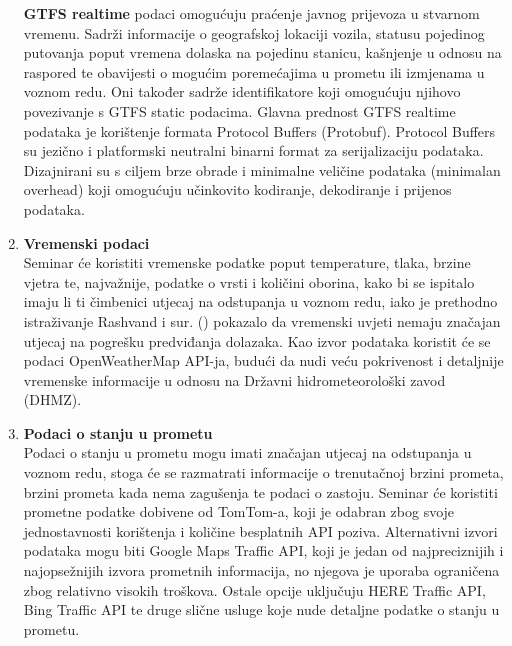 \documentclass[seminarskirad]{fer}
\begin{document}
\begin{enumerate}
	\textbf{GTFS realtime} podaci omogućuju praćenje javnog prijevoza u stvarnom vremenu. Sadrži informacije o geografskoj lokaciji vozila, statusu pojedinog putovanja poput vremena dolaska na pojedinu stanicu, kašnjenje u odnosu na raspored te obavijesti o mogućim poremećajima u prometu ili izmjenama u voznom redu. Oni također sadrže identifikatore koji omogućuju njihovo povezivanje s GTFS static podacima. Glavna prednost GTFS realtime podataka je korištenje formata Protocol Buffers (Protobuf). Protocol Buffers su jezično i platformski neutralni binarni format za serijalizaciju podataka. Dizajnirani su s ciljem brze obrade i minimalne veličine podataka (minimalan overhead) koji omogućuju učinkovito kodiranje, dekodiranje i prijenos podataka.
	
	\item \textbf{Vremenski podaci}\\
	Seminar će koristiti vremenske podatke poput temperature, tlaka, brzine vjetra te, najvažnije, podatke o vrsti i količini oborina, kako bi se ispitalo imaju li ti čimbenici utjecaj na odstupanja u voznom redu, iako je prethodno istraživanje Rashvand i sur. (\cite{article1}) pokazalo da vremenski uvjeti nemaju značajan utjecaj na pogrešku predviđanja dolazaka. Kao izvor podataka koristit će se podaci OpenWeatherMap API-ja, budući da nudi veću pokrivenost i detaljnije vremenske informacije u odnosu na Državni hidrometeorološki zavod (DHMZ).
	
	\item \textbf{Podaci o stanju u prometu}\\
	Podaci o stanju u prometu mogu imati značajan utjecaj na odstupanja u voznom redu, stoga će se razmatrati informacije o trenutačnoj brzini prometa, brzini prometa kada nema zagušenja te podaci o zastoju. Seminar će koristiti prometne podatke dobivene od TomTom-a, koji je odabran zbog svoje jednostavnosti korištenja i količine besplatnih API poziva. Alternativni izvori podataka mogu biti Google Maps Traffic API, koji je jedan od najpreciznijih i najopsežnijih izvora prometnih informacija, no njegova je uporaba ograničena zbog relativno visokih troškova. Ostale opcije uključuju HERE Traffic API, Bing Traffic API te druge slične usluge koje nude detaljne podatke o stanju u prometu.
	
\end{enumerate}
\end{document}
